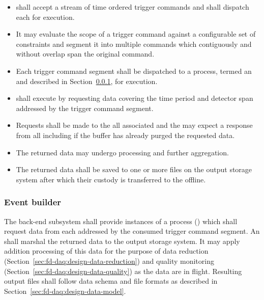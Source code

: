 \begin{itemize}
\item {} shall accept a stream of time ordered trigger commands and shall dispatch each for execution.
\item It may evaluate the scope of a trigger command against a configurable set of constraints and segment it into multiple commands which contiguously and without overlap span the original command.
\item Each trigger command segment shall be dispatched to a process, termed an  and described in Section~\ref{sec:fd-daq:design-event-builder}, for execution.
\item {} shall execute by requesting data covering the time period and detector span addressed by the trigger command segment.
\item Requests shall be made to the all associated  and the  may expect a response from all including if the buffer has already purged the requested data.
\item The returned data may undergo processing and further aggregation.
\item The returned data shall be saved to one or more files on the output storage system after which their custody is transferred to the offline.
\end{itemize}



\subsubsection{Event builder}
\label{sec:fd-daq:design-event-builder}


The  back-end subsystem shall provide instances of a process () which shall request data from each  addressed by the consumed trigger command segment.  An  shall marshal the returned data to the output storage system.  It may apply addition processing of this data for the purpose of data reduction (Section~\ref{sec:fd-daq:design-data-reduction}) and quality monitoring (Section~\ref{sec:fd-daq:design-data-quality}) as the data are in flight. 
Resulting output files shall follow data schema and file formats as described in Section~\ref{sec:fd-daq:design-data-model}.


